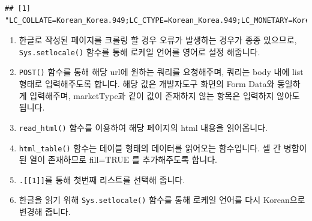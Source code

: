 \documentclass[]{book}
\newenvironment{Shaded}{\begin{snugshade}}{\end{snugshade}}
\newcommand{\DataTypeTok}[1]{\textcolor[rgb]{0.13,0.29,0.53}{#1}}
\newcommand{\DecValTok}[1]{\textcolor[rgb]{0.00,0.00,0.81}{#1}}
\newcommand{\KeywordTok}[1]{\textcolor[rgb]{0.13,0.29,0.53}{\textbf{#1}}}
\newcommand{\NormalTok}[1]{#1}
\newcommand{\OperatorTok}[1]{\textcolor[rgb]{0.81,0.36,0.00}{\textbf{#1}}}
\newcommand{\OtherTok}[1]{\textcolor[rgb]{0.56,0.35,0.01}{#1}}
\newcommand{\StringTok}[1]{\textcolor[rgb]{0.31,0.60,0.02}{#1}}
\providecommand{\tightlist}{%
  \setlength{\itemsep}{0pt}\setlength{\parskip}{0pt}}
\begin{document}
\begin{Shaded}
\end{Shaded}

\begin{verbatim}
## [1] "LC_COLLATE=Korean_Korea.949;LC_CTYPE=Korean_Korea.949;LC_MONETARY=Korean_Korea.949;LC_NUMERIC=C;LC_TIME=Korean_Korea.949"
\end{verbatim}

\begin{enumerate}
\def\labelenumi{\arabic{enumi}.}
\tightlist
\item
  한글로 작성된 페이지를 크롤링 할 경우 오류가 발생하는 경우가 종종 있으므로, \texttt{Sys.setlocale()} 함수를 통해 로케일 언어를 영어로 설정 해줍니다.
\item
  \texttt{POST()} 함수를 통해 해당 url에 원하는 쿼리를 요청해주며, 쿼리는 body 내에 list 형태로 입력해주도록 합니다. 해당 값은 개발자도구 화면의 Form Data와 동일하게 입력해주며, marketType과 같이 값이 존재하지 않는 항목은 입력하지 않아도 됩니다.
\item
  \texttt{read\_html()} 함수를 이용하여 해당 페이지의 html 내용을 읽어옵니다.
\item
  \texttt{html\_table()} 함수는 테이블 형태의 데이터를 읽어오는 함수입니다. 셀 간 병합이 된 열이 존재하므로 fill=TRUE 를 추가해주도록 합니다.
\item
  \texttt{.{[}{[}1{]}{]}}를 통해 첫번째 리스트를 선택해 줍니다.
\item
  한글을 읽기 위해 \texttt{Sys.setlocale()} 함수를 통해 로케일 언어를 다시 Korean으로 변경해 줍니다.
\end{enumerate}
\end{document}
